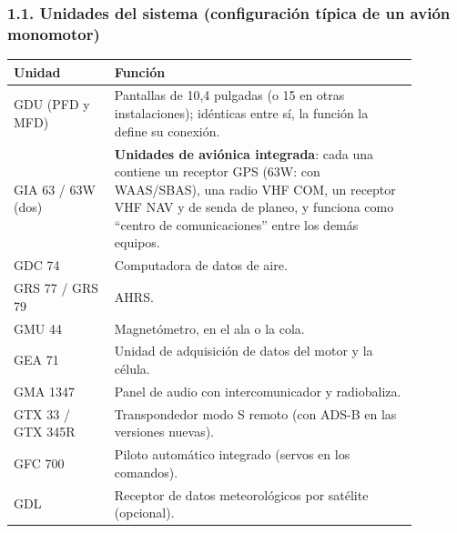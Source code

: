 \subsubsection*{1.1. Unidades del sistema (configuración típica de un avión monomotor)}
\begin{center}
\small
\begin{tabular}{|p{0.22\linewidth}|p{0.66\linewidth}|}
\hline
\textbf{Unidad} & \textbf{Función} \\ \hline
GDU (PFD y MFD) & Pantallas de 10,4 pulgadas (o 15 en otras instalaciones); idénticas entre sí,
la función la define su conexión. \\ \hline
GIA 63 / 63W (dos) & \textbf{Unidades de aviónica integrada}: cada una contiene un receptor GPS
(63W: con WAAS/SBAS), una radio VHF COM, un receptor VHF NAV y de senda de planeo, y funciona como
``centro de comunicaciones'' entre los demás equipos. \\ \hline
GDC 74 & Computadora de datos de aire. \\ \hline
GRS 77 / GRS 79 & AHRS. \\ \hline
GMU 44 & Magnetómetro, en el ala o la cola. \\ \hline
GEA 71 & Unidad de adquisición de datos del motor y la célula. \\ \hline
GMA 1347 & Panel de audio con intercomunicador y radiobaliza. \\ \hline
GTX 33 / GTX 345R & Transpondedor modo S remoto (con ADS-B en las versiones nuevas). \\ \hline
GFC 700 & Piloto automático integrado (servos en los comandos). \\ \hline
GDL & Receptor de datos meteorológicos por satélite (opcional). \\ \hline
\end{tabular}
\end{center}

